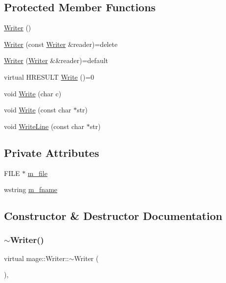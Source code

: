 \subsection*{Protected Member Functions}
\begin{DoxyCompactItemize}
\item 
\hyperlink{classmage_1_1_writer_a40b6cd3005d509e670c5a49272d9ef27}{Writer} ()
\item 
\hyperlink{classmage_1_1_writer_a0988d427f687ad5334c2ba74993e0d6e}{Writer} (const \hyperlink{classmage_1_1_writer}{Writer} \&reader)=delete
\item 
\hyperlink{classmage_1_1_writer_a241e8a12f0dba91b437de40639eda325}{Writer} (\hyperlink{classmage_1_1_writer}{Writer} \&\&reader)=default
\item 
virtual H\+R\+E\+S\+U\+LT \hyperlink{classmage_1_1_writer_a7ef124095098e7ea8f95e3be16499be3}{Write} ()=0
\item 
void \hyperlink{classmage_1_1_writer_aa1d5d19391489a1a7dc5560de7a73141}{Write} (char c)
\item 
void \hyperlink{classmage_1_1_writer_a2ab7f0f1098bda12918598feb32cfb62}{Write} (const char $\ast$str)
\item 
void \hyperlink{classmage_1_1_writer_a454d553d7cf0c3680d48ed9528f22dbd}{Write\+Line} (const char $\ast$str)
\end{DoxyCompactItemize}
\subsection*{Private Attributes}
\begin{DoxyCompactItemize}
\item 
F\+I\+LE $\ast$ \hyperlink{classmage_1_1_writer_a04428b72245b50d45c62cbd23c2f039a}{m\+\_\+file}
\item 
wstring \hyperlink{classmage_1_1_writer_afa271ee47897d4961e9d62132d8faeb5}{m\+\_\+fname}
\end{DoxyCompactItemize}


\subsection{Constructor \& Destructor Documentation}
\hypertarget{classmage_1_1_writer_a04fe27246806384099d518231c75c09f}{}\label{classmage_1_1_writer_a04fe27246806384099d518231c75c09f} 
\subsubsection{\texorpdfstring{$\sim$\+Writer()}{~Writer()}}
{\footnotesize\ttfamily virtual mage\+::\+Writer\+::$\sim$\+Writer (\begin{DoxyParamCaption}{ }\end{DoxyParamCaption})\hspace{0.3cm}{\ttfamily [virtual]}, {\ttfamily [default]}}

